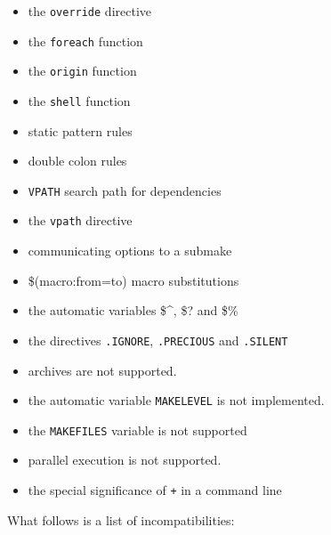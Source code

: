 \begin{itemize}
\item the {\tt override} directive
\item the {\tt foreach} function
\item the {\tt origin} function
\item the {\tt shell} function
\item static pattern rules
\item double colon rules
\item {\tt VPATH} search path for dependencies
\item the {\tt vpath} directive
\item communicating options to a submake
\item \$(macro:from=to) macro substitutions
\item the automatic variables \$\^{}, \$? and \$\%
\item the directives {\tt .IGNORE}, {\tt .PRECIOUS} and {\tt .SILENT}
\item archives are not supported.
\item the automatic variable {\tt MAKELEVEL} is not implemented.
\item the {\tt MAKEFILES} variable is not supported
\item parallel execution is not supported.
\item the special significance of {\tt +} in a command line
\end{itemize}

What follows is a list of incompatibilities:

